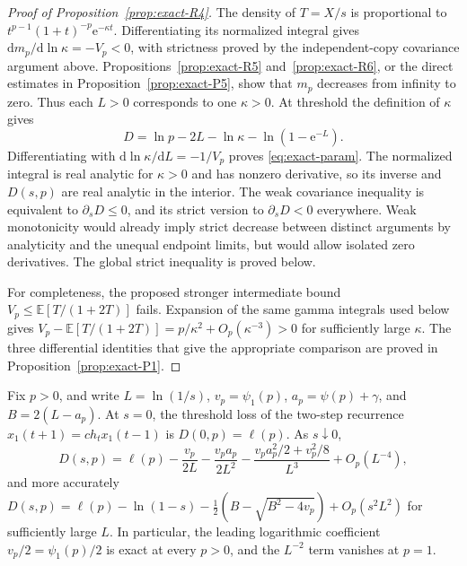 \begin{proof}[Proof of Proposition~\ref{prop:exact-R4}]
The density of $T=X/s$ is proportional to $t^{p-1}(1+t)^{-p}\mathrm{e}^{-\kappa t}$. Differentiating its normalized integral gives $\mathrm{d}m_p/\mathrm{d}\ln\kappa=-V_p<0$, with strictness proved by the independent-copy covariance argument above. Propositions~\ref{prop:exact-R5} and~\ref{prop:exact-R6}, or the direct estimates in Proposition~\ref{prop:exact-P5}, show that $m_p$ decreases from infinity to zero. Thus each $L>0$ corresponds to one $\kappa>0$. At threshold the definition of $\kappa$ gives
\begin{equation}
 D=\ln p-2L-\ln\kappa-\ln(1-\mathrm{e}^{-L}).
 \label{eq:exact-D-param}
\end{equation}
Differentiating with $\mathrm{d}\ln\kappa/\mathrm{d}L=-1/V_p$ proves \eqref{eq:exact-param}. The normalized integral is real analytic for $\kappa>0$ and has nonzero derivative, so its inverse and $D(s,p)$ are real analytic in the interior. The weak covariance inequality is equivalent to $\partial_sD\leq0$, and its strict version to $\partial_sD<0$ everywhere. Weak monotonicity would already imply strict decrease between distinct arguments by analyticity and the unequal endpoint limits, but would allow isolated zero derivatives. The global strict inequality is proved below.

For completeness, the proposed stronger intermediate bound $V_p\leq\mathbb{E}[T/(1+2T)]$ fails. Expansion of the same gamma integrals used below gives $V_p-\mathbb{E}[T/(1+2T)]=p/\kappa^2+O_p(\kappa^{-3})>0$ for sufficiently large $\kappa$. The three differential identities that give the appropriate comparison are proved in Proposition~\ref{prop:exact-P1}.
\end{proof}

\begin{proposition}\label{prop:exact-R5}
Fix $p > 0$, and write $L = \ln(1/s)$, $v_p = \psi_1(p)$, $a_p = \psi(p) + \gamma$, and $B = 2(L - a_p)$. At $s = 0$, the threshold loss of the two-step recurrence $x_1(t+1) = c h_t x_1(t-1)$ is $D(0,p) = \ell(p)$. As $s \downarrow 0$,
\begin{equation}
D(s,p) = \ell(p) - \frac{v_p}{2L} - \frac{v_p a_p}{2L^2} - \frac{v_p a_p^2/2 + v_p^2/8}{L^3} + O_p(L^{-4}),
\label{eq:exact-small-s}
\end{equation}
and more accurately $D(s,p) = \ell(p) - \ln(1-s) - \tfrac{1}{2}(B - \sqrt{B^2 - 4 v_p}) + O_p(s^2 L^2)$ for sufficiently large $L$. In particular, the leading logarithmic coefficient $v_p/2 = \psi_1(p)/2$ is exact at every $p > 0$, and the $L^{-2}$ term vanishes at $p = 1$.
\end{proposition}

